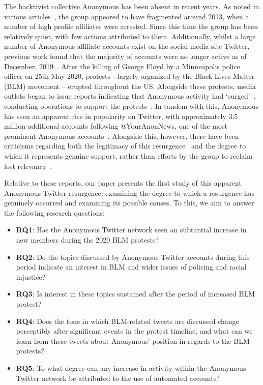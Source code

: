 \documentclass[letterpaper]{article}
\begin{document}
The hacktivist collective Anonymous has been absent in recent years. As noted in various articles~\cite{Uitermark2017}, the group appeared to have fragmented around 2013, when a number of high profile affiliates were arrested. Since this time the group has been relatively quiet, with few actions attributed to them. Additionally, whilst a large number of Anonymous affiliate accounts exist on the social media site Twitter, previous work found that the majority of accounts were no longer active as of December, 2019~\cite{Jones2020}. 
After the killing of George Floyd by a Minneapolis police officer on 25th May 2020, protests - largely organized by the Black Lives Matter (BLM) movement -- erupted throughout the US. Alongside these protests, media outlets began to issue reports indicating that Anonymous activity had `surged'~\cite{Independant2020}, conducting operations to support the protests~\cite{AJC2020}. In tandem with this, Anonymous has seen an apparent rise in popularity on Twitter, with approximately 3.5 million additional accounts following @YourAnonNews, one of the most prominent Anonymous accounts~\cite{Independant2020}. Alongside this, however, there have been criticisms regarding both the legitimacy of this resurgence~\cite{Independant2020} and the degree to which it represents genuine support, rather than efforts by the group to reclaim lost relevancy~\cite{Telegraph2020}.

Relative to these reports, our paper presents the first study of this apparent Anonymous Twitter resurgence; examining the degree to which a resurgence has genuinely occurred and examining its possible causes. To this, we aim to answer the following research questions:

\begin{itemize}
\item \textbf{RQ1}: Has the Anonymous Twitter network seen an subtantial increase in new members during the 2020 BLM protests?

\item \textbf{RQ2}: Do the topics discussed by Anonymous Twitter accounts during this period indicate an interest in BLM and wider issues of policing and racial injustice?

\item \textbf{RQ3}: Is interest in these topics sustained after the period of increased BLM protest?

\item \textbf{RQ4}: Does the tone in which BLM-related tweets are discussed change perceptibly after significant events in the protest timeline, and what can we learn from these tweets about Anonymous' position in regards to the BLM protests?

\item \textbf{RQ5}: To what degree can any increase in activity within the Anonymous Twitter network be attributed to the use of automated accounts?
\end{itemize}
\end{document}
